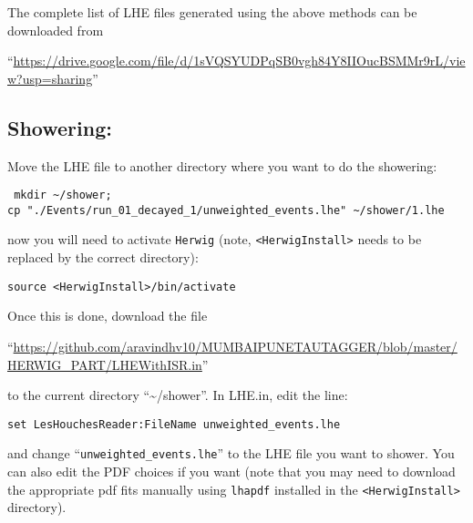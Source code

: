 The complete list of LHE files generated using the above methods can be downloaded from\\
\begin{flushleft}
    ``\small{\url{https://drive.google.com/file/d/1sVQSYUDPqSB0vgh84Y8IIOucBSMMr9rL/view?usp=sharing}}''
\end{flushleft}

\subsection{Showering:}
Move the LHE file to another directory where you want to do the showering:
\begin{center}
    \begin{minipage}{0.8\textwidth}
        {\tt
            mkdir  \textasciitilde/shower;\\
            cp "./Events/run\_01\_decayed\_1/unweighted\_events.lhe" \textasciitilde/shower/1.lhe
        }
    \end{minipage}
\end{center}
now you will need to activate {\tt Herwig} (note, {\tt <HerwigInstall>} needs to be replaced by the correct directory):
\begin{center}
    \begin{minipage}{0.7\textwidth}
        {\tt source <HerwigInstall>/bin/activate}
    \end{minipage}
\end{center}

Once this is done, download the file
\begin{flushleft}
    ``\small{\url{https://github.com/aravindhv10/MUMBAIPUNETAUTAGGER/blob/master/HERWIG_PART/LHEWithISR.in}}''
\end{flushleft}
to the current directory ``\textasciitilde/shower''. In LHE.in, edit the line:
\begin{center}
    \begin{minipage}{0.7\textwidth}
        {\tt set LesHouchesReader:FileName unweighted\_events.lhe}
    \end{minipage}
\end{center}
and change ``{\tt unweighted\_events.lhe}'' to the LHE file you want to shower.
You can also edit the PDF choices if you want (note that you may need to download the appropriate pdf fits manually using {\tt lhapdf} installed in the {\tt <HerwigInstall>} directory).

